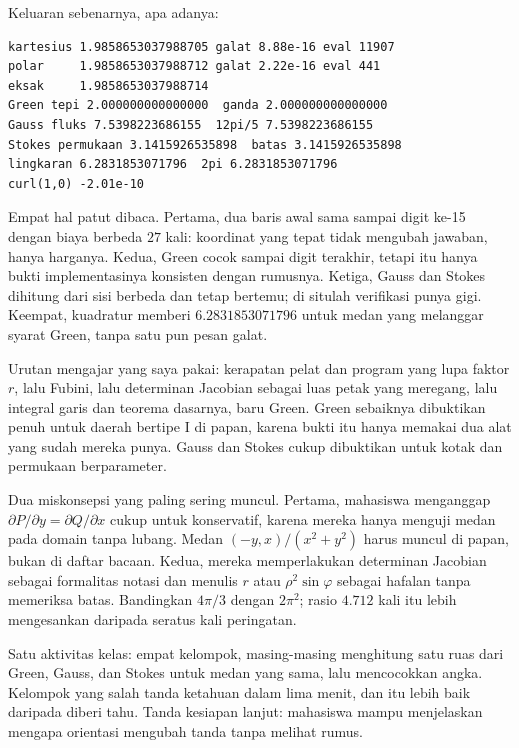 Keluaran sebenarnya, apa adanya:

\begin{verbatim}
kartesius 1.9858653037988705 galat 8.88e-16 eval 11907
polar     1.9858653037988712 galat 2.22e-16 eval 441
eksak     1.9858653037988714
Green tepi 2.000000000000000  ganda 2.000000000000000
Gauss fluks 7.5398223686155  12pi/5 7.5398223686155
Stokes permukaan 3.1415926535898  batas 3.1415926535898
lingkaran 6.2831853071796  2pi 6.2831853071796
curl(1,0) -2.01e-10
\end{verbatim}

Empat hal patut dibaca. Pertama, dua baris awal sama sampai digit ke-15 dengan
biaya berbeda $27$ kali: koordinat yang tepat tidak mengubah jawaban, hanya
harganya. Kedua, Green cocok sampai digit terakhir, tetapi itu
hanya bukti implementasinya konsisten dengan rumusnya. Ketiga, Gauss dan Stokes
dihitung dari sisi berbeda dan tetap bertemu; di situlah verifikasi punya gigi.
Keempat, kuadratur memberi $6.2831853071796$ untuk medan yang melanggar syarat
Green, tanpa satu pun pesan galat.

\begin{untukdosen}
Urutan mengajar yang saya pakai: kerapatan pelat dan program yang lupa faktor
$r$, lalu Fubini, lalu determinan Jacobian sebagai luas petak yang meregang,
lalu integral garis dan teorema dasarnya, baru Green. Green sebaiknya dibuktikan
penuh untuk daerah bertipe I di papan, karena bukti itu hanya memakai dua alat
yang sudah mereka punya. Gauss dan Stokes cukup dibuktikan untuk kotak dan
permukaan berparameter.

Dua miskonsepsi yang paling sering muncul. Pertama, mahasiswa menganggap
$\partial P/\partial y=\partial Q/\partial x$ cukup untuk konservatif, karena
mereka hanya menguji medan pada domain tanpa lubang. Medan
$(-y,x)/(x^{2}+y^{2})$ harus muncul di papan, bukan di daftar bacaan. Kedua,
mereka memperlakukan determinan Jacobian sebagai formalitas notasi dan menulis
$r$ atau $\rho^{2}\sin\varphi$ sebagai hafalan tanpa memeriksa batas.
Bandingkan $4\pi/3$ dengan $2\pi^{2}$; rasio $4.712$ kali itu lebih mengesankan
daripada seratus kali peringatan.

Satu aktivitas kelas: empat kelompok, masing-masing menghitung satu ruas dari
Green, Gauss, dan Stokes untuk medan yang sama, lalu mencocokkan angka. Kelompok
yang salah tanda ketahuan dalam lima menit, dan itu lebih baik daripada diberi
tahu. Tanda kesiapan lanjut: mahasiswa mampu menjelaskan mengapa orientasi
mengubah tanda tanpa melihat rumus.
\end{untukdosen}

